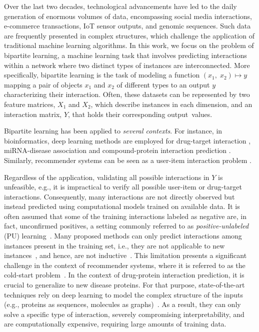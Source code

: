 \documentclass[letterpaper]{article}
\begin{document}
Over the last two decades, technological advancements have led to the daily generation of enormous volumes of data, encompassing social media interactions, e-commerce transactions, IoT sensor outputs, and genomic sequences.
Such data are frequently presented in complex structures, which challenge the application of traditional machine learning algorithms.
In this work, we focus on the problem of bipartite learning, a machine learning task that involves predicting interactions within a network where two distinct types of instances are interconnected.
%
More specifically, bipartite learning is the task of modeling a function $(x_1,\; x_2) \mapsto y$ mapping a pair of objects $x_1$ and $x_2$ of different types to an output $y$ characterizing their interaction. Often, these datasets can be represented by two feature matrices, $X_1$ and $X_2$, which describe instances in each dimension, and an interaction matrix, $Y$, that holds their corresponding output~values. %


Bipartite learning has been applied to \emph{several contexts}.
For instance, in bioinformatics, deep learning methods are employed for drug-target interaction \cite{huang_moltrans_2020,lin2023comprehensive, bagherian2021machine,liu2024ssldti}, miRNA-disease association \cite{tian2024mgcnss} and compound-protein interaction prediction \cite{tsubaki2019compound}.
Similarly, recommender systems can be seen as a user-item interaction problem \cite{aggarwal2016recommender}.

Regardless of the application, validating all possible interactions in $Y$ is unfeasible, e.g., it is impractical to verify all possible user-item or drug-target interactions. Consequently, many interactions are not directly observed but instead predicted using computational models trained on available data. It is often assumed that some of the training interactions labeled as negative are, in fact, unconfirmed positives, a setting commonly referred to as \emph{positive-unlabeled} (PU) learning~\cite{bekker2020learning}.
Many proposed methods can only predict interactions among instances present in the training set, i.e., they are not applicable to new instances~\cite{park_flaws_2012,schrynemackers_protocols_2013,pahikkala_toward_2015}, and hence, are not inductive~\cite{chapelle_semi-supervised_2006}. This limitation presents a significant challenge in the context of recommender systems, where it is referred to as the cold-start problem~\cite{gharahighehi_addressing_2022}. In the context of drug-protein interaction prediction, it is crucial to generalize to new disease proteins.
For that purpose, state-of-the-art techniques rely on deep learning to model the complex structure of the inputs (e.g., proteins as sequences, molecules as graphs)~\cite{huang_moltrans_2020,dehghan_tripletmultidti_2023}. As a result, they can only solve a specific type of interaction, severely compromising interpretability, and are computationally expensive, requiring large amounts of training data.
\end{document}
